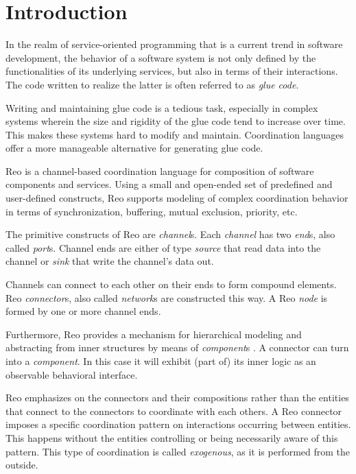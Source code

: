 \label{sec:reo}
\section{Introduction}
In the realm of service-oriented programming that is a current trend in software development, the behavior of a software system is not only defined by the functionalities of its underlying services, but also in terms of their interactions. The code written to realize the latter is often referred to as \emph{glue code}. 

Writing and maintaining glue code is a tedious task, especially in complex systems wherein the size and rigidity of the glue code tend to increase over time. This makes these systems hard to modify and maintain. 
Coordination languages offer a more manageable alternative for generating glue code. 

Reo \cite{Arbab04RCC} is a channel-based coordination language for composition of software components and services. Using a small and open-ended set of predefined and user-defined constructs, Reo supports modeling of complex coordination behavior in terms of synchronization, buffering, mutual exclusion, priority, etc. 

The primitive constructs of Reo are \emph{channel}s. Each \emph{channel} has two \emph{end}s, also called \emph{port}s. Channel ends are either of type \emph{source} that read data into the channel or \emph{sink} that write the channel's data out. 

Channels can connect to each other on their ends to form compound elements. Reo \emph{connector}s, also called \emph{network}s are constructed this way. A Reo \emph{node} is formed by one or more channel ends. 

Furthermore, Reo provides a mechanism for hierarchical modeling and abstracting from inner structures by means of \emph{component}s \cite{Arbab04RCC}. A connector can turn into a \emph{component}. In this case it will exhibit (part of) its inner logic as an observable behavioral interface.

Reo emphasizes on the connectors and their compositions rather than the entities that connect to the connectors to coordinate with each others. A Reo connector imposes a specific coordination pattern on interactions occurring between entities. This happens without the entities controlling or being necessarily aware of this pattern. This type of coordination is called \emph{exogenous}, as it is performed from the outside. 

